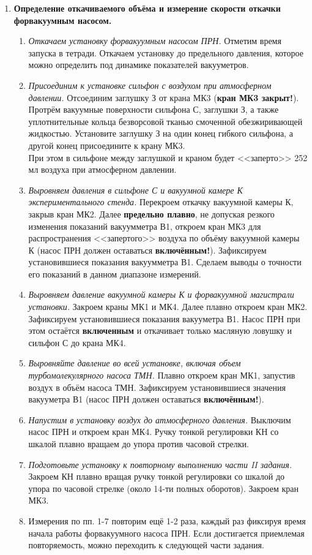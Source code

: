 \documentclass[a4paper,12pt]{article} %
\begin{document}
\begin{enumerate}
\item \textbf{Определение откачиваемого объёма и измерение скорости откачки форвакуумным насосом.}
\begin{enumerate}
	\item \textit{Откачаем установку форвакуумным насосом ПРН.} Отметим время запуска  в тетради. Откачаем установку до предельного давления, которое можно определить под динамике показателей вакууметров.
	\item \textit{Присоединим к установке сильфон с воздухом при атмосферном давлении.} Отсоединим заглушку З от крана МК3 (\textbf{кран МК3 закрыт!}). Протрём вакуумные поверхности сильфона С, заглушки З, а также уплотнительные кольца безворсовой тканью смоченной обезжиривающей жидкостью. Установите заглушку З на один конец гибкого сильфона, а другой конец присоедините к крану МК3. \\ При этом в сильфоне между заглушкой и краном будет <<заперто>> 252 мл воздуха при атмосферном давлении. 
	\item \textit{Выровняем давления в сильфоне С и вакуумной камере К экспериментального стенда.} Перекроем откачку вакуумной камеры К, закрыв кран МК2. Далее \textbf{предельно  плавно},  не допуская  резкого  изменения  показаний  вакуумметра В1, откроем кран МК3 для распространения <<запертого>> воздуха по объёму вакуумной камеры К (насос ПРН должен оставаться \textbf{включённым!}). Зафиксируем установившиеся показания  вакуумметра В1. Сделаем  выводы  о точности  его  показаний  в данном  диапазоне  измерений. 
	\item \textit{Выровняем давление вакуумной камеры К и форвакуумной магистрали установки.} Закроем  краны МК1  и МК4.  Далее  плавно  откроем  кран  МК2. Зафиксируем установившиеся показания вакууметра В1. Насос ПРН при этом остаётся \textbf{включенным} и откачивает только масляную ловушку и сильфон С до крана МК4. 
	\item \textit{Выровняйте  давление  во  всей  установке,  включая  объем  турбомолекулярного насоса ТМН.} Плавно откроем кран МК1, запустив воздух в объём насоса ТМН. Зафиксируем установившиеся значения вакууметра В1 (насос ПРН должен оставаться \textbf{включённым!}). 
	\item \textit{Напустим в установку воздух до атмосферного давления.} Выключим насос ПРН и откроем кран МК4. Ручку тонкой регулировки КН со шкалой плавно вращаем до упора против часовой стрелки.
	\item \textit{Подготовьте  установку  к  повторному  выполнению  части II  задания.}
	Закроем КН плавно вращая ручку тонкой регулировки со шкалой до упора  по часовой  стрелке  (около  14-ти  полных  оборотов).  Закроем кран МК3.
	\item Измерения по пп. 1-7 повторим ещё 1-2 раза, каждый  раз фиксируя время начала работы форвакуумного насоса ПРН. Если  достигается  приемлемая  повторяемость,  можно  переходить к следующей части задания.
	

\end{enumerate}
\end{enumerate}
\end{document}
